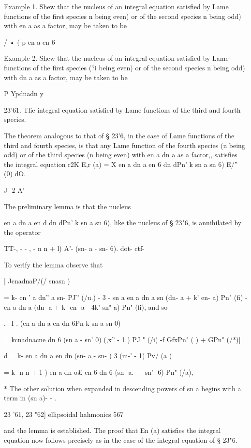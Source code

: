 {{{{{{{{Example 1. Shew that the nucleus of an integral equation satisfied by
Lame functions of the first species n being even) or of the second
species n being odd) with en a as a factor, may be taken to be

/ • (-p en a en 6

Example 2. Shew that the nucleus of an integral equation satisfied by
Lame functions of the first species (?i being even) or of the second
species n being odd) with dn a as a factor, may be taken to be

P Ypdnadn y

23'61. Tlie integral equation satisfied by Lame functions of the third
and fourth species.

The theorem analogous to that of § 23'6, in the case of Lame functions
of the third and fourth species, is that any Lame function of the
fourth species (n being odd) or of the third species (n being even)
with en a dn a as a factor,, satisfies the integral equation r2K E,r
(a) = X en a dn a en 6 dn dPn' k sn a sn 6) E/'' (0) dO.

J -2 A'

The preliminary lemma is that the nucleus

en a dn a en d dn dPn' k sn a sn 6), like the nucleus of § 23"6, is
annihilated by the operator

TT-, - - , - n n + l) A'- (sn- a - sn- 6). dot- ctf-

To verify the lemma observe that

| JcnadnaP/(/ snasn )

= k- cn ' a dn'' a sn- PJ'' (/u.) - 3 - sn a en a dn a sn (dn- a + k'
en- a) Pn" (fi) - en a dn a (dn- a + k- en- a - 4k' sn" a) Pn" (fi),
and so

. \ I . (en a dn a en dn 6Pn k sn a sn 0)\

= kcnadnacne dn 6 (sn a - sn' 0) (,x'' - 1 ) PJ " (/i) -f GfxPn" ( ) +
GPn" (/*)]

d = k- en a dn a en dn (sn- a - sn- ) 3 (m-' - 1) Pv/ (a )

= k- n n + 1 ) en a dn o£ en 6 dn 6 (sn- a. — sn'- 6) Pn" (/a),

* The other solution when expanded in descending powers of sn a begins
with a term in (sn a)- - .

23 '61, 23 "62] ellipsoidal hahmonics 567

and the lemma is established. The proof that En (a) satisfies the
integral equation now follows precisely as in the case of the integral
equation of § 23"6.

}}}}}}}}
